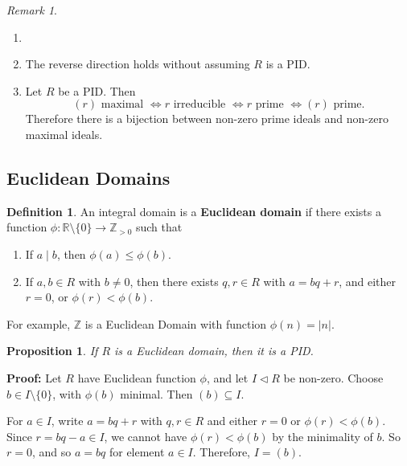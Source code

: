 \documentclass[12pt]{article}
\newtheorem{proposition}{Proposition}[section]
\theoremstyle{definition}
\newtheorem{definition}{Definition}[section]
\theoremstyle{remark}
\newtheorem*{remark}{Remark}
\begin{document}
\begin{remark}
	\begin{enumerate}[label = (\roman*)]
		\item[]
		\item The reverse direction holds without assuming $R$ is a PID.
		\item Let $R$ be a PID. Then
			\[
				(r) \text{ maximal } \iff r \text{ irreducible } \iff r \text{ prime } \iff (r) \text{ prime}
			.\]
			Therefore there is a bijection between non-zero prime ideals and non-zero maximal ideals.
	\end{enumerate}
\end{remark}

\subsection{Euclidean Domains}%
\label{sub:euclidean_domains}

\begin{definition}
	An integral domain is a \textbf{Euclidean domain} if there exists a function $\phi : \mathbb{R} \setminus \{0\} \to \mathbb{Z}_{> 0}$ such that
	\begin{enumerate}[label = (\roman*)]
		\item If $a \mid b$, then $\phi(a) \leq \phi(b)$.
		\item If $a, b \in R$ with $b \neq 0$, then there exists $q, r \in R$ with $a = bq + r$, and either $r = 0$, or $\phi(r) < \phi(b)$.
	\end{enumerate}
\end{definition}

For example, $\mathbb{Z}$ is a Euclidean Domain with function $\phi(n) = |n|$.

\begin{proposition}
	If $R$ is a Euclidean domain, then it is a PID.
\end{proposition}

\begin{adjustbox}{minipage = \columnwidth - 25.5pt, margin=1em, frame=1pt, margin=0em}
	\textbf{Proof:} Let $R$ have Euclidean function $\phi$, and let $I \lhd R$ be non-zero. Choose $b \in I \setminus \{0\}$, with $\phi(b)$ minimal. Then $(b) \subseteq I$.

	For $a \in I$, write $a = bq + r$ with $q, r \in R$ and either $r = 0$ or $\phi(r) < \phi(b)$. Since $r = bq - a \in I$, we cannot have $\phi(r) < \phi(b)$ by the minimality of $b$. So $r = 0$, and so $a = bq$ for element $a \in I$. Therefore, $I = (b)$.
\end{adjustbox}
\end{document}
